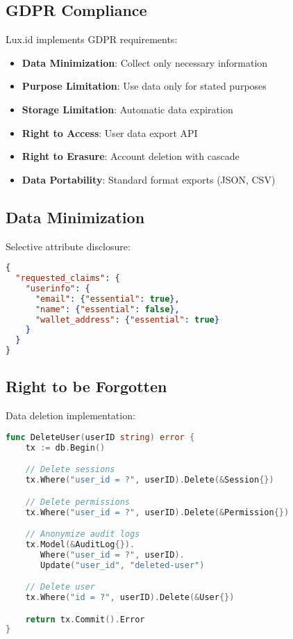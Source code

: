 \documentclass[11pt,a4paper]{article}
\begin{document}
\subsection{GDPR Compliance}

Lux.id implements GDPR requirements:

\begin{itemize}
    \item \textbf{Data Minimization}: Collect only necessary information
    \item \textbf{Purpose Limitation}: Use data only for stated purposes
    \item \textbf{Storage Limitation}: Automatic data expiration
    \item \textbf{Right to Access}: User data export API
    \item \textbf{Right to Erasure}: Account deletion with cascade
    \item \textbf{Data Portability}: Standard format exports (JSON, CSV)
\end{itemize}

\subsection{Data Minimization}

Selective attribute disclosure:

\begin{lstlisting}[language=json]
{
  "requested_claims": {
    "userinfo": {
      "email": {"essential": true},
      "name": {"essential": false},
      "wallet_address": {"essential": true}
    }
  }
}
\end{lstlisting}

\subsection{Right to be Forgotten}

Data deletion implementation:

\begin{lstlisting}[language=Go]
func DeleteUser(userID string) error {
    tx := db.Begin()

    // Delete sessions
    tx.Where("user_id = ?", userID).Delete(&Session{})

    // Delete permissions
    tx.Where("user_id = ?", userID).Delete(&Permission{})

    // Anonymize audit logs
    tx.Model(&AuditLog{}).
       Where("user_id = ?", userID).
       Update("user_id", "deleted-user")

    // Delete user
    tx.Where("id = ?", userID).Delete(&User{})

    return tx.Commit().Error
}
\end{lstlisting}
\end{document}
